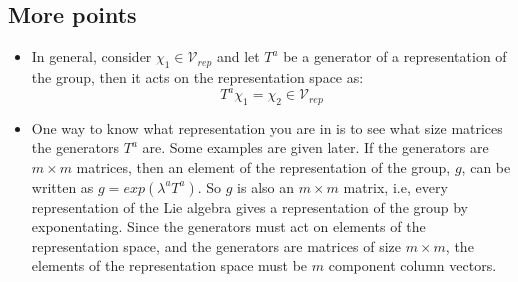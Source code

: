 \subsection{More points}
\begin{itemize}
  \item In general, consider $\chi_1\in\mathcal{V}_{rep}$ and let $T^a$ be a
    generator of a representation of the group, then it acts on the
    representation
    space as:
    \begin{equation}
      T^a\chi_{1}=\chi_2\in\mathcal{V}_{rep}
    \end{equation}
  \item One way to know what representation you are in is to see what
    size matrices the generators $T^a$ are. Some examples are given later.
    If the generators are $m\times m$ matrices, then an element of the
    representation
    of the group, $g$, can be written as $g=exp{(\lambda^a T^a)}$. So $g$ is
    also an $m\times m$ matrix, i.e, every representation of the Lie algebra
    gives a representation of the group by exponentating. Since the generators
    must act on elements of the representation space, and  the generators are
    matrices of size $m\times m$, the elements of the representation space must
    be $m$ component column vectors.


\end{itemize}
